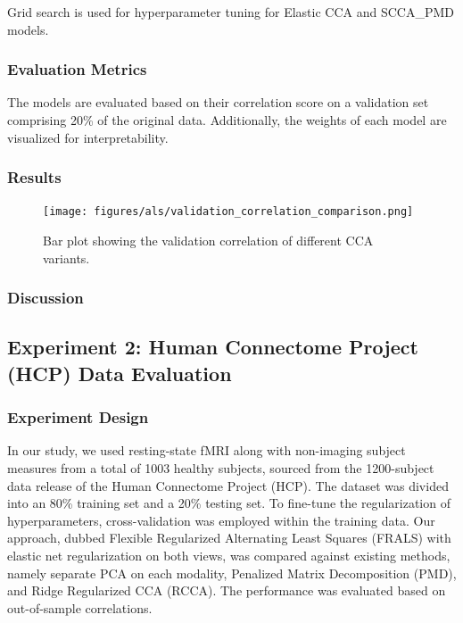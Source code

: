 Grid search is used for hyperparameter tuning for Elastic CCA and SCCA\_PMD models.

\subsubsection{Evaluation Metrics}

The models are evaluated based on their correlation score on a validation set comprising 20\% of the original data. Additionally, the weights of each model are visualized for interpretability.

\subsubsection{Results}

\begin{figure}[h]
\centering
\texttt{[image: figures/als/validation\_correlation\_comparison.png]}
\caption{Bar plot showing the validation correlation of different CCA variants.}
\end{figure}



\subsubsection{Discussion}



\subsection{Experiment 2: Human Connectome Project (HCP) Data Evaluation}

\subsubsection{Experiment Design}
In our study, we used resting-state fMRI along with non-imaging subject measures from a total of 1003 healthy subjects, sourced from the 1200-subject data release of the Human Connectome Project (HCP). The dataset was divided into an 80\% training set and a 20\% testing set.
To fine-tune the regularization of hyperparameters, cross-validation was employed within the training data.
Our approach, dubbed Flexible Regularized Alternating Least Squares (FRALS) with elastic net regularization on both views, was compared against existing methods, namely separate PCA on each modality, Penalized Matrix Decomposition (PMD), and Ridge Regularized CCA (RCCA). The performance was evaluated based on out-of-sample correlations.

